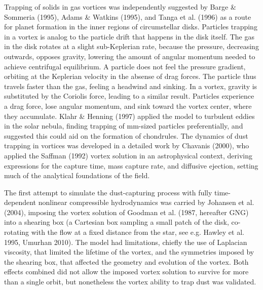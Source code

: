 \documentclass[apj]{emulateapj}
\begin{document}

% 

Trapping of solids in gas vortices was independently suggested
by Barge \& Sommeria (1995), Adams \& Watkins (1995), and Tanga et al. (1996) as a route for
planet formation in the inner regions of circumstellar
disks. Particles trapping in a vortex is analog to the particle drift
that happens in the disk
itself. The gas in the disk rotates at a slight sub-Keplerian rate,
because the pressure, decreasing outwards, opposes gravity,
lowering the amount of angular momentum needed to achieve centrifugal
equilibrium. A particle does not feel the pressure gradient, orbiting at
the Keplerian velocity in the absense of drag forces. The particle
thus travels faster than the gas, feeling a
headwind and sinking. In a vortex, gravity is substituted by the
Coriolis force, leading to a similar result. Particles experience a
drag force, lose angular momentum, and sink toward the vortex
center, where they accumulate. Klahr \& Henning (1997) applied the model 
to turbulent eddies in the solar nebula, finding trapping of mm-sized
particles preferentially, and suggested this could aid on the
formation of chondrules. The dynamics of dust trapping in vortices was 
developed in a detailed work by Chavanis (2000), who applied the
Saffman (1992) vortex solution in an astrophysical context, deriving expressions for
the capture time, mass capture rate, and diffusive ejection, setting
much of the analytical foundations of the field. 


The first attempt to simulate the dust-capturing process with
fully time-dependent nonlinear compressible hydrodynamics was carried
by Johansen et al. (2004), imposing the vortex solution of Goodman et al. (1987,
hereafter GNG) into a shearing box (a Cartesian box sampling a small
patch of the disk, co-rotating with the flow at a fixed distance from
the star, see e.g. Hawley et al. 1995, Umurhan 2010). The model had limitations, chiefly the use of Laplacian
viscosity, that limited the lifetime of the vortex, and the symmetries
imposed by the shearing box, that affected the geometry and evolution
of the vortex.  Both effects combined did not allow the
imposed vortex solution to survive for more than a single orbit, but
nonetheless the vortex ability to trap dust was validated. 
\end{document}

